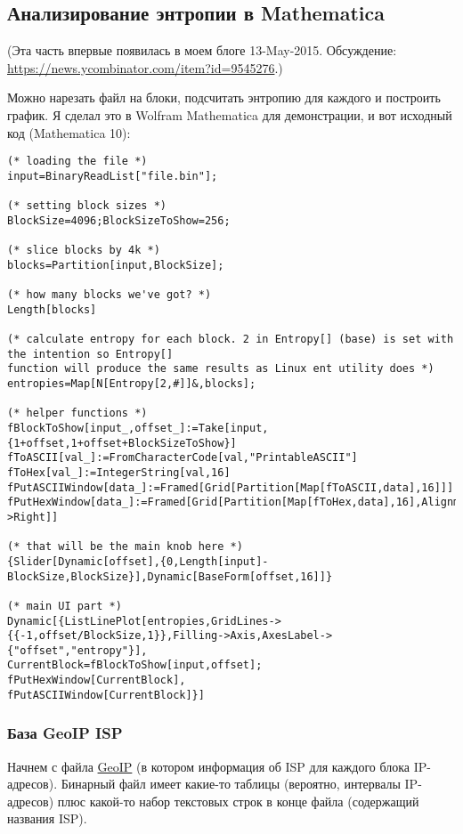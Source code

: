 \subsection{Анализирование энтропии в Mathematica}
\newcommand{\EntropyGfxScale}{0.8\textwidth}

(Эта часть впервые появилась в моем блоге 13-May-2015.
Обсуждение: \url{https://news.ycombinator.com/item?id=9545276}.)

Можно нарезать файл на блоки, подсчитать энтропию для каждого и построить график.
Я сделал это в Wolfram Mathematica для демонстрации, и вот исходный код (Mathematica 10):

\begin{lstlisting}[style=custommath]
(* loading the file *)
input=BinaryReadList["file.bin"];

(* setting block sizes *)
BlockSize=4096;BlockSizeToShow=256;

(* slice blocks by 4k *)
blocks=Partition[input,BlockSize];

(* how many blocks we've got? *)
Length[blocks]

(* calculate entropy for each block. 2 in Entropy[] (base) is set with the intention so Entropy[] 
function will produce the same results as Linux ent utility does *)
entropies=Map[N[Entropy[2,#]]&,blocks];

(* helper functions *)
fBlockToShow[input_,offset_]:=Take[input,{1+offset,1+offset+BlockSizeToShow}]
fToASCII[val_]:=FromCharacterCode[val,"PrintableASCII"]
fToHex[val_]:=IntegerString[val,16]
fPutASCIIWindow[data_]:=Framed[Grid[Partition[Map[fToASCII,data],16]]]
fPutHexWindow[data_]:=Framed[Grid[Partition[Map[fToHex,data],16],Alignment->Right]]

(* that will be the main knob here *)
{Slider[Dynamic[offset],{0,Length[input]-BlockSize,BlockSize}],Dynamic[BaseForm[offset,16]]}

(* main UI part *)
Dynamic[{ListLinePlot[entropies,GridLines->{{-1,offset/BlockSize,1}},Filling->Axis,AxesLabel->{"offset","entropy"}],
CurrentBlock=fBlockToShow[input,offset];
fPutHexWindow[CurrentBlock],
fPutASCIIWindow[CurrentBlock]}]
\end{lstlisting}

\subsubsection{База GeoIP \ac{ISP}}

Начнем с файла \href{https://www.maxmind.com/en/geoip-demo}{GeoIP}
(в котором информация об \ac{ISP} для каждого блока IP-адресов).
Бинарный файл  имеет какие-то таблицы (вероятно, интервалы IP-адресов) плюс какой-то набор текстовых строк
в конце файла (содержащий названия \ac{ISP}).

